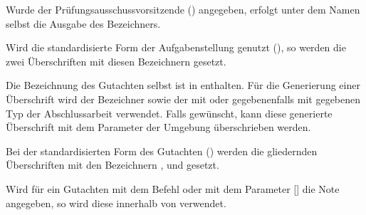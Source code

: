 \documentclass[%
  english,ngerman,%
  headings=optiontoheadandtoc,captions=tableheading,numbers=noenddot,%
  chapterpage,cdfoot,%
]{tudscrman}
\begin{document}
\begin{Declaration}{}
\printdeclarationlist%
Wurde der Prüfungsausschussvorsitzende () angegeben, erfolgt 
unter dem Namen selbst die Ausgabe des Bezeichners.
\end{Declaration}

\begin{Declaration}{}
\begin{Declaration}{}
\printdeclarationlist%
Wird die standardisierte Form der Aufgabenstellung genutzt (), 
so werden die zwei Überschriften mit diesen Bezeichnern gesetzt.
\end{Declaration}
\end{Declaration}

\begin{Declaration}{}
\begin{Declaration}{}
\printdeclarationlist%
Die Bezeichnung des Gutachten selbst ist in  enthalten. 
Für die Generierung einer Überschrift wird der Bezeichner  
sowie der mit  oder gegebenenfalls mit  gegebenen 
Typ der Abschlussarbeit verwendet. Falls gewünscht, kann diese generierte 
Überschrift mit dem Parameter  der 
Umgebung  überschrieben werden.
\end{Declaration}
\end{Declaration}

\begin{Declaration}{}
\begin{Declaration}{}
\printdeclarationlist%
Bei der standardisierten Form des Gutachten () werden die 
gliedernden Überschriften mit den Bezeichnern , 
 und  gesetzt.
\end{Declaration}
\end{Declaration}

\begin{Declaration}{}
\printdeclarationlist%
Wird für ein Gutachten mit dem Befehl  oder mit dem 
Parameter [] die Note 
angegeben, so wird diese innerhalb von  verwendet.
\end{Declaration}
\end{document}

